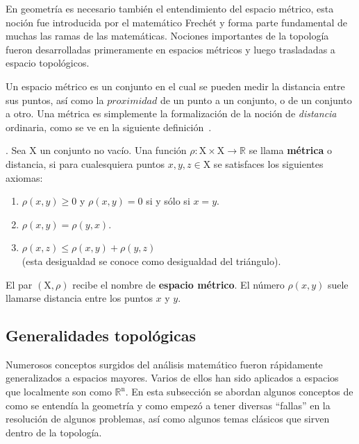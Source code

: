 En geometría es necesario también el entendimiento del espacio métrico, esta
noción fue introducida por el matemático Frechét y forma parte fundamental de
muchas las ramas de las matemáticas.  Nociones importantes de la topología
fueron desarrolladas primeramente en espacios métricos y luego trasladadas a
espacio topológicos.

Un espacio métrico es un conjunto en el cual se pueden medir la distancia entre
sus puntos, así como la $proximidad$ de un punto a un conjunto, o de un
conjunto a otro. Una métrica es simplemente la formalización de la noción de
\textit{distancia} ordinaria, como se ve en la siguiente
definición~\cite{sergey}.

{}. Sea $\mathrm{X}$ un conjunto no vacío. Una función $\rho :
\mathrm{X} \times\mathrm{X} \rightarrow \mathbb{R}$ se llama \textbf{métrica} o
distancia, si para cualesquiera puntos $x, y, z \in \mathrm{X}$ se satisfaces
los siguientes axiomas:
\begin{enumerate}
\item $\rho (x,y) \ge 0$ y $\rho(x,y)=0$ si y sólo si $x=y$.
\item $\rho (x,y) = \rho (y,x)$.
\item $\rho (x,z) \le \rho (x,y)+\rho(y,z)$\\ (esta desigualdad se conoce como
desigualdad del triángulo).
\end{enumerate}

El par $(\mathrm{X},\rho)$ recibe el nombre de \textbf{espacio métrico}. El
número $\rho(x,y)$ suele llamarse distancia entre los puntos $x$ y $y$.

\subsection{Generalidades topológicas}

Numerosos conceptos surgidos del análisis matemático fueron rápidamente
generalizados a espacios mayores. Varios de ellos han sido aplicados a espacios
que localmente son como $\mathbb{R}^\mathrm{n}$. En esta subsección se abordan
algunos conceptos de como se entendía la geometría y como empezó a tener
diversas ``fallas'' en la resolución de algunos problemas, así como algunos
temas clásicos que sirven dentro de la topología.

